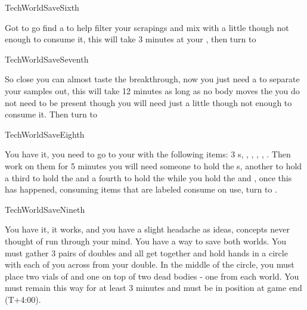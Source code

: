 \documentclass[greennotebook]{guildcamp3} %
\begin{document}
\begin{page}{TechWorldSaveSixth}
	
	 Got to go find a  \iSieve{} to help filter your scrapings and mix with a little \iBloodPlasma{} though not enough to consume it, this will take 3 minutes at your \sTechWorkbench{}, then turn to  
	
\end{page}

\begin{page}{TechWorldSaveSeventh}
	
	So close you can almost taste the breakthrough, now you just need a \iCentrifuge{} to separate your samples out, this will take 12 minutes as long as no body moves the \iCentrifuge{} you do not need to be present though you will need just a little \iGraphiteLube{} though not enough to consume it. Then turn to  
	
\end{page}

\begin{page}{TechWorldSaveEighth}
	
	 You have it, you need to go to your \sTechWorkbench{} with the following items: 3 \iTFResistor{}s, \iScrapMetal{}, \iCog{}, \iCircuitBoard{}, \iFlashlight{}, \iMultitool{}. Then work on them for 5 minutes you will need someone to hold the \iTFResistor{}s, another to hold  \iScrapMetal{} a third to hold the \iCog{} and a fourth to hold the \iCircuitBoard{} while you hold the \iFlashlight{} and \iMultitool{}, once this has happened, consuming items that are labeled consume on use, turn to .
	
\end{page}

\begin{page}{TechWorldSaveNineth}
	
	You have it, it works, and you have a slight headache as ideas, concepts never thought of run through your mind. You have a way to save both worlds.  You must gather 3 pairs of doubles and all get together and hold hands in a circle with each of you across from your double. In the middle of the circle, you must place two vials of \iBloodPlasma{} and one \iEctoplasm{} on top of two dead bodies - one from each world. You must remain this way for at least 3 minutes and must be in position at game end (T+4:00).
	
\end{page}

\endnotebook
\end{document}
